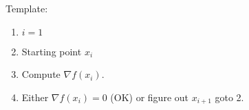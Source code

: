 Template:
\begin{enumerate}
    \item $i=1$
    \item Starting point $x_i$
    \item Compute $\nabla f(x_i)$.
    \item Either $\nabla f(x_i) = 0$ (OK) or figure out $x_{i+1}$ goto 2.
\end{enumerate} 